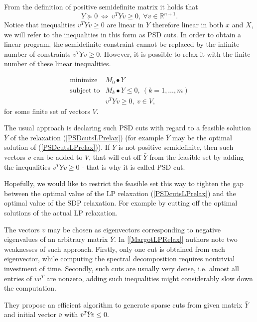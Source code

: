 \documentclass[12pt]{book}
\theoremstyle{definition}
\begin{document}
From the definition of positive semidefinite matrix it holds that
\begin{equation}
Y\succeq 0 \ \Leftrightarrow \ v^TYv \geq 0, \ \forall v\in\mathbb{R}^{n+1}.
\end{equation}
Notice that inequalities $ v^TYv \geq 0$ are linear in $Y$ therefore linear in both $x$ and $X$, we will refer to the inequalities in this form as PSD cuts.
In order to obtain a linear program, the semidefinite constraint cannot be replaced by the infinite number of constraints  $v^TYv \geq 0$.
However, it is possible to relax it with the finite number of these linear inequalities. 

\begin{equation}
\label{PSDcutsLPrelax} 
\begin{array}{ll}
\mbox{minimize}& M_0\bullet Y \\
\mbox{subject to}& M_k\bullet Y \leq 0, \  (k = 1,\dots ,m)\\
& v^TYv\geq 0, \ v\in V,
\end{array} 
\end{equation}
for some finite set of vectors $V$.

The usual approach is declaring such PSD cuts with regard to a feasible solution $\bar{Y}$ of the relaxation (\ref{PSDcutsLPrelax}) (for example $\bar{Y}$ may be the optimal solution of (\ref{PSDcutsLPrelax})). If $\bar{Y}$ is not positive semidefinite, then such vectors $v$ can be added to $V$, that will cut off $\bar{Y}$ from the feasible set by adding the inequalities $v^TYv\geq 0$ - that is why it is called PSD cut. 

Hopefully, we would like to restrict the feasible set this way to tighten the gap between the optimal value of the LP relaxation (\ref{PSDcutsLPrelax}) and the optimal value of the SDP relaxation. For example by cutting off the optimal solutions of the actual LP relaxation.


The vectors $v$ may be chosen as eigenvectors corresponding to negative eigenvalues of an arbitrary matrix $\bar{Y}$.
In [\ref{MargotLPRelax}] authors note two weaknesses of such approach. Firstly, only one cut is
obtained from each eigenvector, while computing the spectral decomposition requires nontrivial investment of time. Secondly,
such cuts are usually very dense, i.e. almost all entries of $\bar{v}\bar{v}^T$ are nonzero, adding such inequalities might considerably slow down the computation. 

They propose an efficient algorithm to generate sparse cuts from given matrix $\bar{Y}$ and initial vector $\bar{v}$ with $\bar{v}^{T}\bar{Y}\bar{v} \leq 0$. 
\end{document}

